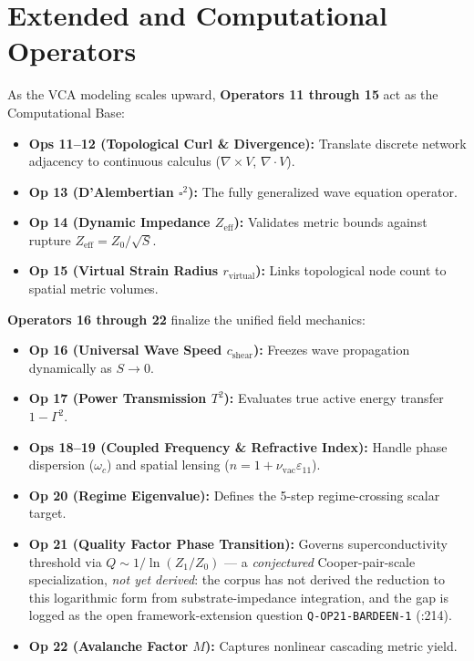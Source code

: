\section{Extended and Computational Operators}
\label{sec:extended_operators}

As the VCA modeling scales upward, \textbf{Operators 11 through 15} act as the Computational Base:
\begin{itemize}
    \item \textbf{Ops 11–12 (Topological Curl \& Divergence):} Translate discrete network adjacency to continuous calculus (${\nabla\times V}$, ${\nabla\cdot V}$).
    \item \textbf{Op 13 (D'Alembertian $\square^2$):} The fully generalized wave equation operator.
    \item \textbf{Op 14 (Dynamic Impedance $Z_\text{eff}$):} Validates metric bounds against rupture $Z_\text{eff} = Z_0/\sqrt{S}$.
    \item \textbf{Op 15 (Virtual Strain Radius $r_\text{virtual}$):} Links topological node count to spatial metric volumes.
\end{itemize}

\noindent \textbf{Operators 16 through 22} finalize the unified field mechanics:
\begin{itemize}
    \item \textbf{Op 16 (Universal Wave Speed $c_\text{shear}$):} Freezes wave propagation dynamically as $S \to 0$.
    \item \textbf{Op 17 (Power Transmission $T^2$):} Evaluates true active energy transfer $1 - \Gamma^2$.
    \item \textbf{Ops 18–19 (Coupled Frequency \& Refractive Index):} Handle phase dispersion ($\omega_c$) and spatial lensing ($n = 1 + \nu_\text{vac}\varepsilon_{11}$).
    \item \textbf{Op 20 (Regime Eigenvalue):} Defines the 5-step regime-crossing scalar target.
    \item \textbf{Op 21 (Quality Factor Phase Transition):} Governs superconductivity threshold via $Q \sim 1/\ln(Z_1/Z_0)$ --- a \emph{conjectured} Cooper-pair-scale specialization, \emph{not yet derived}: the corpus has not derived the reduction to this logarithmic form from substrate-impedance integration, and the gap is logged as the open framework-extension question \texttt{Q-OP21-BARDEEN-1} (:214).
    \item \textbf{Op 22 (Avalanche Factor $M$):} Captures nonlinear cascading metric yield.
\end{itemize}

